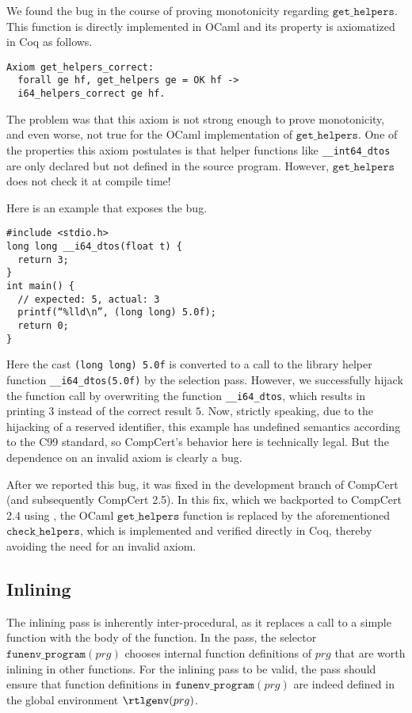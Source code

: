 We found the bug in the course of proving monotonicity regarding
$\texttt{get\_helpers}$. This function is directly implemented in
OCaml and its property is axiomatized in Coq as follows.
\begin{verbatim}
Axiom get_helpers_correct:
  forall ge hf, get_helpers ge = OK hf ->
  i64_helpers_correct ge hf.
\end{verbatim}
The problem was that this axiom is not strong enough to prove
monotonicity, and even worse, not true for the OCaml implementation of
$\texttt{get\_helpers}$. One of the properties this axiom postulates
is that helper functions like \texttt{\_\_int64\_dtos} are only
declared but not defined in the source program. However,
$\texttt{get\_helpers}$ does not check it at compile time!

Here is an example that exposes the bug.
\begin{verbatim}
#include <stdio.h>
long long __i64_dtos(float t) {
  return 3;
}
int main() {
  // expected: 5, actual: 3
  printf(“%lld\n”, (long long) 5.0f);
  return 0;
}
\end{verbatim}
Here the cast \texttt{(long long) 5.0f} is converted to a call to the
library helper function \texttt{\_\_i64\_dtos(5.0f)} by the selection
pass. However, we successfully hijack the function call by overwriting
the function \texttt{\_\_i64\_dtos}, which results in printing $3$
instead of the correct result $5$.  Now, strictly speaking, due to the
hijacking of a reserved identifier, this example has undefined
semantics according to the C99 standard, so CompCert's behavior here
is technically legal.  But the dependence on an invalid axiom is
clearly a bug.

After we reported this bug, it was fixed in the development branch of
CompCert (and subsequently CompCert 2.5). In this fix, which we
backported to CompCert 2.4 using , the OCaml
$\texttt{get\_helpers}$ function is replaced by the aforementioned
$\texttt{check\_helpers}$, which is implemented and verified directly
in Coq, thereby avoiding the need for an invalid axiom.

\subsection{Inlining}
The inlining pass is inherently inter-procedural, as it replaces a
call to a simple function with the body of the function.  In the pass,
the selector $\texttt{funenv\_program}(prg)$ chooses internal function
definitions of $prg$ that are worth inlining in other functions.  For
the inlining pass to be valid, the pass should ensure that function
definitions in $\texttt{funenv\_program}(prg)$ are indeed defined in
the global environment $\rtlgenv(prg)$.

